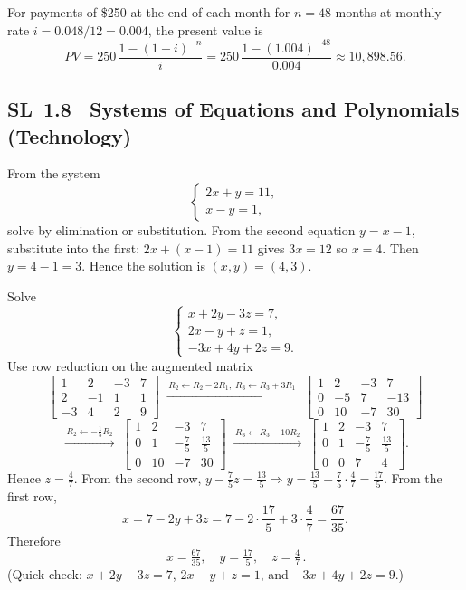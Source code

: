 \documentclass[11pt]{article}
\newcommand{\tocsubsection}[1]{\subsection{#1}}
\begin{document}
\begin{solution}
For payments of \$250 at the end of each month for $n=48$ months at monthly rate $i=0.048/12=0.004$, the present value is
\[
PV = 250\,\frac{1 - (1+i)^{-n}}{i} = 250\,\frac{1 - (1.004)^{-48}}{0.004} \approx 10{,}898.56.
\]
\end{solution}


\tocsubsection{SL 1.8 \; Systems of Equations and Polynomials (Technology)}

\begin{solution}
From the system 
\[
\begin{cases}
2x + y = 11,\\
x - y = 1,
\end{cases}
\]
solve by elimination or substitution. From the second equation $y = x - 1$, substitute into the first: $2x + (x - 1) = 11$ gives $3x=12$ so $x=4$. Then $y = 4 - 1 = 3$. Hence the solution is $(x,y)=(4,3)$.
\end{solution}

\begin{solution}
Solve
\[
\begin{cases}
x+2y-3z=7,\\
2x-y+z=1,\\
-3x+4y+2z=9.
\end{cases}
\]
Use row reduction on the augmented matrix
\[
\left[\begin{array}{ccc|c}
1&2&-3&7\\
2&-1&1&1\\
-3&4&2&9
\end{array}\right]
\;\xrightarrow{\,R_2\leftarrow R_2-2R_1,\; R_3\leftarrow R_3+3R_1\,}\;
\left[\begin{array}{ccc|c}
1&2&-3&7\\
0&-5&7&-13\\
0&10&-7&30
\end{array}\right]
\]
\[
\xrightarrow{\,R_2\leftarrow -\tfrac15 R_2\,}\;
\left[\begin{array}{ccc|c}
1&2&-3&7\\
0&1&-\tfrac{7}{5}&\tfrac{13}{5}\\
0&10&-7&30
\end{array}\right]
\;\xrightarrow{\,R_3\leftarrow R_3-10R_2\,}\;
\left[\begin{array}{ccc|c}
1&2&-3&7\\
0&1&-\tfrac{7}{5}&\tfrac{13}{5}\\
0&0&7&4
\end{array}\right].
\]
Hence \(z=\frac{4}{7}\). From the second row,
\(y-\frac{7}{5}z=\frac{13}{5}\Rightarrow y=\frac{13}{5}+\frac{7}{5}\cdot\frac{4}{7}
=\frac{17}{5}\).
From the first row,
\[
x=7-2y+3z=7-2\cdot\frac{17}{5}+3\cdot\frac{4}{7}
=\frac{67}{35}.
\]
Therefore
\[
\boxed{\,x=\tfrac{67}{35},\quad y=\tfrac{17}{5},\quad z=\tfrac{4}{7}\,}.
\]
(Quick check: \(x+2y-3z=7\), \(2x-y+z=1\), and \(-3x+4y+2z=9\).)
\end{solution}
\end{document}

